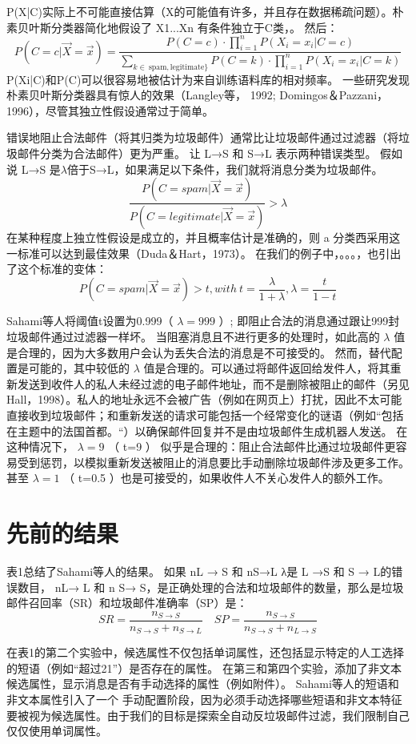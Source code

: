 \documentclass[UTF8]{ctexart}
\begin{document}
P(X|C)实际上不可能直接估算（X的可能值有许多，并且存在数据稀疏问题）。朴素贝叶斯分类器简化地假设了 X1...Xn  有条件独立于C类，。 然后： $$P(C=c | \vec{X}=\vec{x})=\frac{P(C=c) \cdot \prod_{i=1}^{n} P\left(X_{i}=x_{i} | C=c\right)}{\sum_{k \in \mathrm{~ s p a m , l e g i t i m a t e \}}} P(C=k) \cdot \prod_{i=1}^{n} P\left(X_{i}=x_{i} | C=k\right)}$$ P(Xi|C)和P(C)可以很容易地被估计为来自训练语料库的相对频率。 一些研究发现朴素贝叶斯分类器具有惊人的效果（Langley等， 1992; Domingos＆Pazzani，1996），尽管其独立性假设通常过于简单。 

错误地阻止合法邮件（将​​其归类为垃圾邮件）通常比让垃圾邮件通过过滤器（将垃圾邮件分类为合法邮件）更为严重。 让 L→S 和 S→L 表示两种错误类型。 假如说 L→S 是$\lambda$倍于S→L，如果满足以下条件，我们就将消息分类为垃圾邮件。$$\frac{P(C=spam | \vec{X}=\vec{x})}{P(C= legitimate | \vec{X}=\vec{x})}>\lambda$$
在某种程度上独立性假设是成立的，并且概率估计是准确的，则 a 分类西采用这一标准可以达到最佳效果（Duda＆Hart，1973）。 在我们的例子中，。。。，也引出了这个标准的变体：$$P(C=spam | \vec{X}=\vec{x})>t, with\ t=\frac{\lambda}{1+\lambda}, \lambda=\frac{t}{1-t}$$

Sahami等人将阈值t设置为0.999（ $\lambda=999$ ）; 即阻止合法的消息通过跟让999封垃圾邮件通过过滤器一样坏。 当阻塞消息且不进行更多的处理时，如此高的 $\lambda$ 值是合理的，因为大多数用户会认为丢失合法的消息是不可接受的。 然而，替代配置是可能的，其中较低的 $\lambda$ 值是合理的。可以通过将邮件返回给发件人，将其重新发送到收件人的私人未经过滤的电子邮件地址，而不是删除被阻止的邮件（另见Hall，1998）。私人的地址永远不会被广告（例如在网页上）打扰，因此不太可能直接收到垃圾邮件；和重新发送的请求可能包括一个经常变化的谜语（例如“包括在主题中的法国首都。“）以确保邮件回复并不是由垃圾邮件生成机器人发送。 在这种情况下，  $\lambda=9$ （ t=9 ） 似乎是合理的：阻止合法邮件比通过垃圾邮件更容易受到惩罚，以模拟重新发送被阻止的消息要比手动删除垃圾邮件涉及更多工作。 甚至 $ \lambda=1$ （ t=0.5 ）也是可接受的，如果收件人不关心发件人的额外工作。

\section{先前的结果}
表1总结了Sahami等人的结果。 如果 nL → S 和  nS→L λ是 L →S 和 S → L的错误数目， nL→ L 和 n S→ S，是正确处理的合法和垃圾邮件的数量，那么是垃圾邮件召回率（SR）和垃圾邮件准确率（SP）是：$$S R=\frac{n_{S \rightarrow S}}{n_{S \rightarrow S}+n_{S \rightarrow L}} \quad S P=\frac{n_{S \rightarrow S}}{n_{S \rightarrow S}+n_{L \rightarrow S}}$$

在表1的第二个实验中，候选属性不仅包括单词属性，还包括显示特定的人工选择的短语（例如“超过21”）是否存在的属性。 在第三和第四个实验，添加了非文本候选属性，显示消息是否有手动选择的属性（例如附件）。 Sahami等人的短语和非文本属性引入了一个 手动配置阶段，因为必须手动选择哪些短语和非文本特征要被视为候选属性。由于我们的目标是探索全自动反垃圾邮件过滤，我们限制自己仅仅使用单词属性。
\end{document}
